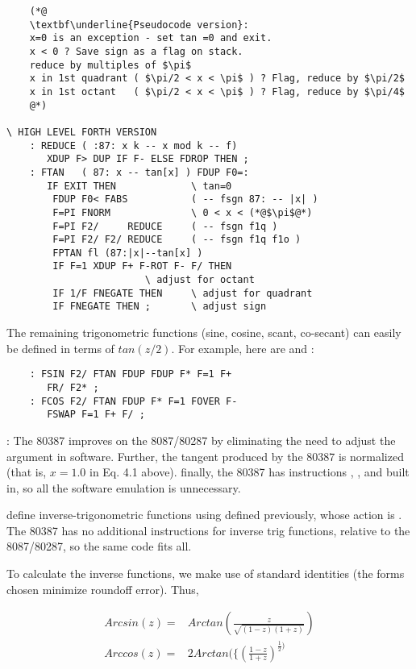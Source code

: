 \begin{lstlisting}
    (*@
    \textbf\underline{Pseudocode version}:
    x=0 is an exception - set tan =0 and exit.
    x < 0 ? Save sign as a flag on stack.
    reduce by multiples of $\pi$
    x in 1st quadrant ( $\pi/2 < x < \pi$ ) ? Flag, reduce by $\pi/2$
    x in 1st octant   ( $\pi/2 < x < \pi$ ) ? Flag, reduce by $\pi/4$
    @*)

\ HIGH LEVEL FORTH VERSION
    : REDUCE ( :87: x k -- x mod k -- f)
       XDUP F> DUP IF F- ELSE FDROP THEN ;
    : FTAN   ( 87: x -- tan[x] ) FDUP F0=:
       IF EXIT THEN             \ tan=0
        FDUP F0< FABS           ( -- fsgn 87: -- |x| )
        F=PI FNORM              \ 0 < x < (*@$\pi$@*)
        F=PI F2/     REDUCE     ( -- fsgn f1q )
        F=PI F2/ F2/ REDUCE     ( -- fsgn f1q f1o )
        FPTAN fl (87:|x|--tan[x] )
        IF F=1 XDUP F+ F-ROT F- F/ THEN
                        \ adjust for octant
        IF 1/F FNEGATE THEN     \ adjust for quadrant
        IF FNEGATE THEN ;       \ adjust sign
\end{lstlisting}

The remaining trigonometric functions (sine, cosine, scant, co-secant) can easily be defined in terms of $tan(z /2)$. For example, here are  and :

\begin{lstlisting}
    : FSIN F2/ FTAN FDUP FDUP F* F=1 F+
       FR/ F2* ;
    : FCOS F2/ FTAN FDUP F* F=1 FOVER F-
       FSWAP F=1 F+ F/ ;
\end{lstlisting}

\leftbar[1\linewidth]
\Note: The 80387 improves on the 8087/80287 by eliminating the
need to adjust the argument in software. Further, the tangent
produced by the 80387 is normalized (that is, $x = 1.0$ in Eq. 4.1
above). finally, the 80387 has instructions , , and  built in, so all the software emulation is unnecessary.
\endleftbar

 define inverse-trigonometric functions using  defined previously, whose action is . The 80387 has no additional instructions for inverse trig functions, relative to the 8087/80287, so the same code fits all.

To calculate the inverse functions, we make use of standard identities (the forms chosen minimize roundoff error). Thus,

\begin{align}
    Arcsin(z) =& Arctan\left(\frac{z}{\sqrt{(1-z)(1+z)}}\right) \\
    Arccos(z) =& 2 Arctan\Big(\{\left(\frac{1-z}{1+z}\right)^{\frac{1}{2}\Big)}
\end{align}

